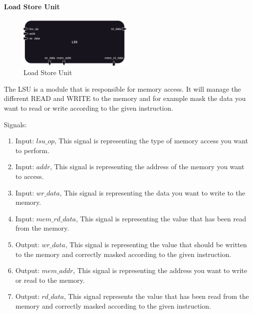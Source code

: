 \paragraph{Load Store Unit}

\begin{figure}[H]
    \centering
    \includegraphics[width=0.5\textwidth]{design/pipelined/memory/images/lsu.png}
    \caption{Load Store Unit}
    \label{fig:lsu}
\end{figure}

The LSU is a module that is responsible for memory access. It will manage the different READ and WRITE to the memory and for example
mask the data you want to read or write according to the given instruction.

Signals:
\begin{enumerate}[label={\textbullet}]
    \item Input: $lsu\_op$, This signal is representing the type of memory access you want to perform.
    \item Input: $addr$, This signal is representing the address of the memory you want to access.
    \item Input: $wr\_data$, This signal is representing the data you want to write to the memory.
    \item Input: $mem\_rd\_data$, This signal is representing the value that has been read from the memory.
    \item Output: $wr\_data$, This signal is representing the value that should be written to the memory and correctly
    masked according to the given instruction.
    \item Output: $mem\_addr$, This signal is representing the address you want to write or read to the memory.
    \item Output: $rd\_data$, This signal represents the value that has been read from the memory and correctly 
    masked according to the given instruction.
\end{enumerate}